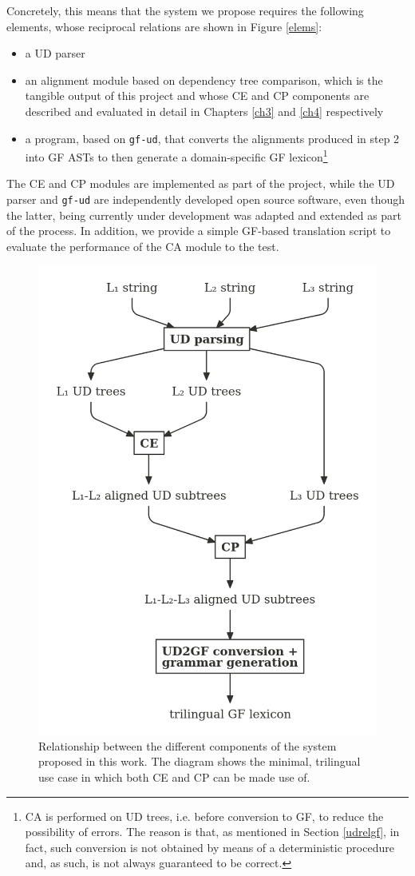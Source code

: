 Concretely, this means that the system we propose requires the following elements, whose reciprocal relations are shown in Figure \ref{elems}: \smallskip

\begin{itemize}
    \item a UD parser
    \item an alignment module based on dependency tree comparison, which is the tangible output of this project and whose CE and CP components are described and evaluated in detail in Chapters \ref{ch3} and \ref{ch4} respectively
    \item a program, based on \texttt{gf-ud}, that converts the alignments produced in step 2 into GF ASTs to then generate a domain-specific GF lexicon\footnote{CA is performed on UD trees, i.e. before conversion to GF, to reduce the possibility of errors. The reason is that, as mentioned in Section \ref{udrelgf}, in fact, such conversion is not obtained by means of a deterministic procedure and, as such, is not always guaranteed to be correct.}
\end{itemize} \smallskip

The CE and CP modules are implemented as part of the project, while the UD parser and \texttt{gf-ud} are independently developed open source software, even though the latter, being currently under development was adapted and extended as part of the process. In addition, we provide a simple GF-based translation script to evaluate the performance of the CA module to the test.

\begin{figure}[h]
    \centering
    \includegraphics[width=.6\linewidth]{figure/elems.png}
    \caption[Relationship between the different components of the CA system]{Relationship between the different components of the system proposed in this work. The diagram shows the minimal, trilingual use case in which both CE and CP can be made use of.} \label{elems}
    \label{sys}
\end{figure}
